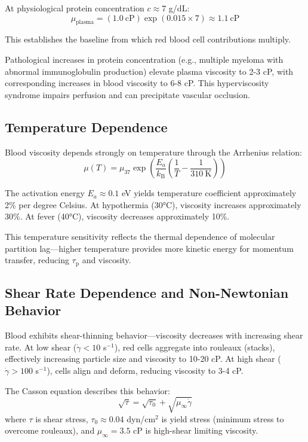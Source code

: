 \documentclass[12pt,a4paper]{article}
\theoremstyle{remark}
\newcommand{\kB}{k_{\mathrm{B}}}
\newcommand{\taulag}{\tau_{\mathrm{p}}}
\begin{document}
At physiological protein concentration $c \approx 7$ g/dL:
\begin{equation}
\mu_{\mathrm{plasma}} = (1.0~\mathrm{cP}) \exp(0.015 \times 7) \approx 1.1~\mathrm{cP}
\end{equation}

This establishes the baseline from which red blood cell contributions multiply.

Pathological increases in protein concentration (e.g., multiple myeloma with abnormal immunoglobulin production) elevate plasma viscosity to 2-3 cP, with corresponding increases in blood viscosity to 6-8 cP. This hyperviscosity syndrome impairs perfusion and can precipitate vascular occlusion.

\subsection{Temperature Dependence}

Blood viscosity depends strongly on temperature through the Arrhenius relation:
\begin{equation}
\mu(T) = \mu_{37} \exp\left(\frac{E_{a}}{\kB}\left(\frac{1}{T} - \frac{1}{310~\mathrm{K}}\right)\right)
\end{equation}

The activation energy $E_{a} \approx 0.1$ eV yields temperature coefficient approximately 2\% per degree Celsius. At hypothermia (30°C), viscosity increases approximately 30\%. At fever (40°C), viscosity decreases approximately 10\%.

This temperature sensitivity reflects the thermal dependence of molecular partition lag—higher temperature provides more kinetic energy for momentum transfer, reducing $\taulag$ and viscosity.

\subsection{Shear Rate Dependence and Non-Newtonian Behavior}

Blood exhibits shear-thinning behavior—viscosity decreases with increasing shear rate. At low shear ($\dot{\gamma} < 10$ s$^{-1}$), red cells aggregate into rouleaux (stacks), effectively increasing particle size and viscosity to 10-20 cP. At high shear ($\dot{\gamma} > 100$ s$^{-1}$), cells align and deform, reducing viscosity to 3-4 cP.

The Casson equation describes this behavior:
\begin{equation}
\sqrt{\tau} = \sqrt{\tau_{0}} + \sqrt{\mu_{\infty} \dot{\gamma}}
\end{equation}
where $\tau$ is shear stress, $\tau_{0} \approx 0.04$ dyn/cm$^{2}$ is yield stress (minimum stress to overcome rouleaux), and $\mu_{\infty} = 3.5$ cP is high-shear limiting viscosity.
\end{document}
